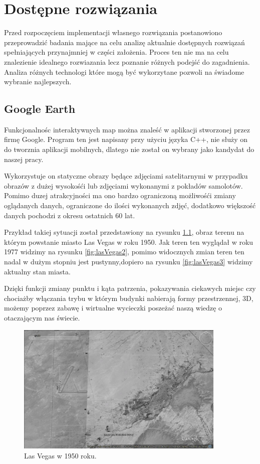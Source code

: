﻿\chapter{Dostępne rozwiązania}
\label{sec:dostepnerozwiazania}

Przed rozpoczęciem implementacji własnego rozwiązania postanowiono przeprowadzić badania mające na celu analizę aktualnie dostępnych rozwiązań spełniających przynajmniej w części założenia. Proces ten nie ma na celu znalezienie idealnego rozwiazania lecz poznanie różnych podejść do zagadnienia. Analiza różnych technologi które mogą być wykorzytane pozwoli na świadome wybranie najlepszych.


\section{Google Earth}
\label{sec:Google Earth}

Funkcjonalnośc interaktywnych map można znaleść w aplikacji stworzonej przez firmę Google. Program ten jest napisany przy użyciu języka C++, nie służy on do tworznia aplikacji mobilnych, dlatego nie został on wybrany jako kandydat do naszej pracy.

Wykorzystuje on statyczne obrazy będące zdjęciami satelitarnymi w przypadku obrazów z dużej wysokośći lub zdjęciami wykonanymi z pokładów samolotów. Pomimo duzej atrakcyjności ma ono bardzo ograniczoną możliwośći zmiany oglądanych danych, ograniczone do ilości wykonanych zdjęć, dodatkowo większość danych pochodzi z okresu ostatnich 60 lat.

Przykład takiej sytuacji został przedstawiony na rysunku \ref{fig:lasVegas1}, obraz terenu na którym powstanie miasto Las Vegas w roku 1950. Jak teren ten wyglądał w roku 1977 widzimy na rysunku \ref{fig:lasVegas2}, pomimo widocznych zmian teren ten nadal w dużym stopniu jest pustynny,dopiero na rysunku \ref{fig:lasVegas3} widzimy aktualny stan miasta.

Dzięki funkcji zmiany punktu i kąta patrzenia, pokazywania ciekawych miejsc czy chociażby włączania trybu w którym budynki nabierają formy przestrzennej, 3D, możemy poprzez zabawę i wirtualne wycieczki poszeżać naszą wiedzę o otaczającym nas świecie.


\begin{figure}[H]
  \centering
    \includegraphics[width=100mm]{ge/01_1950.jpg}
  \caption{Las Vegas w 1950 roku.}
  \label{fig:lasVegas1}
\end{figure}

